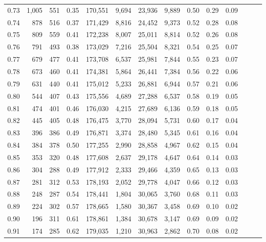 \begin{tabular}{rrrrrrrrrrrrrr}
0.73 &  1,005 &    551 &  0.35 &  170,551 &    9,694 &  23,936 &   9,889 &  0.50 &  0.29 &      0.09 \\
0.74 &    878 &    516 &  0.37 &  171,429 &    8,816 &  24,452 &   9,373 &  0.52 &  0.28 &      0.08 \\
0.75 &    809 &    559 &  0.41 &  172,238 &    8,007 &  25,011 &   8,814 &  0.52 &  0.26 &      0.08 \\
0.76 &    791 &    493 &  0.38 &  173,029 &    7,216 &  25,504 &   8,321 &  0.54 &  0.25 &      0.07 \\
0.77 &    679 &    477 &  0.41 &  173,708 &    6,537 &  25,981 &   7,844 &  0.55 &  0.23 &      0.07 \\
0.78 &    673 &    460 &  0.41 &  174,381 &    5,864 &  26,441 &   7,384 &  0.56 &  0.22 &      0.06 \\
0.79 &    631 &    440 &  0.41 &  175,012 &    5,233 &  26,881 &   6,944 &  0.57 &  0.21 &      0.06 \\
0.80 &    544 &    407 &  0.43 &  175,556 &    4,689 &  27,288 &   6,537 &  0.58 &  0.19 &      0.05 \\
0.81 &    474 &    401 &  0.46 &  176,030 &    4,215 &  27,689 &   6,136 &  0.59 &  0.18 &      0.05 \\
0.82 &    445 &    405 &  0.48 &  176,475 &    3,770 &  28,094 &   5,731 &  0.60 &  0.17 &      0.04 \\
0.83 &    396 &    386 &  0.49 &  176,871 &    3,374 &  28,480 &   5,345 &  0.61 &  0.16 &      0.04 \\
0.84 &    384 &    378 &  0.50 &  177,255 &    2,990 &  28,858 &   4,967 &  0.62 &  0.15 &      0.04 \\
0.85 &    353 &    320 &  0.48 &  177,608 &    2,637 &  29,178 &   4,647 &  0.64 &  0.14 &      0.03 \\
0.86 &    304 &    288 &  0.49 &  177,912 &    2,333 &  29,466 &   4,359 &  0.65 &  0.13 &      0.03 \\
0.87 &    281 &    312 &  0.53 &  178,193 &    2,052 &  29,778 &   4,047 &  0.66 &  0.12 &      0.03 \\
0.88 &    248 &    287 &  0.54 &  178,441 &    1,804 &  30,065 &   3,760 &  0.68 &  0.11 &      0.03 \\
0.89 &    224 &    302 &  0.57 &  178,665 &    1,580 &  30,367 &   3,458 &  0.69 &  0.10 &      0.02 \\
0.90 &    196 &    311 &  0.61 &  178,861 &    1,384 &  30,678 &   3,147 &  0.69 &  0.09 &      0.02 \\
0.91 &    174 &    285 &  0.62 &  179,035 &    1,210 &  30,963 &   2,862 &  0.70 &  0.08 &      0.02 \\

\end{tabular}
